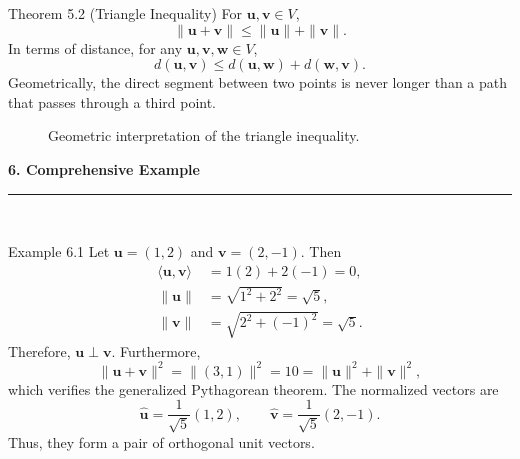 \documentclass[11pt,letterpaper]{article}
\newcommand{\manualsection}[1]{%
  \Needspace{16\baselineskip}%
  \vspace{0.35cm}
  {\Large\bfseries\color{blackmain} #1}\\[2pt]
  {\color{orangeacc}\rule{\linewidth}{1.4pt}}\\[0.25cm]
}
\begin{document}
\begin{theorembox}{Theorem 5.2 (Triangle Inequality)}
For $\mathbf{u},\mathbf{v}\in V$,
\begin{equation}
  \|\mathbf{u}+\mathbf{v}\|\leq\|\mathbf{u}\|+\|\mathbf{v}\|.
\end{equation}
In terms of distance, for any $\mathbf{u},\mathbf{v},\mathbf{w}\in V$,
\begin{equation}
  d(\mathbf{u},\mathbf{v})
  \leq d(\mathbf{u},\mathbf{w})+d(\mathbf{w},\mathbf{v}).
\end{equation}
Geometrically, the direct segment between two points is never longer than a path
that passes through a third point.
\end{theorembox}

\begin{figure}[htbp]
\centering
{}
\caption{Geometric interpretation of the triangle inequality.}
\label{fig:triangle-inequality}
\end{figure}
\FloatBarrier

\manualsection{6. Comprehensive Example}

\begin{examplebox}{Example 6.1}
Let $\mathbf{u}=(1,2)$ and $\mathbf{v}=(2,-1)$. Then
\begin{align*}
  \langle\mathbf{u},\mathbf{v}\rangle&=1(2)+2(-1)=0,\\
  \|\mathbf{u}\|&=\sqrt{1^2+2^2}=\sqrt{5},\\
  \|\mathbf{v}\|&=\sqrt{2^2+(-1)^2}=\sqrt{5}.
\end{align*}
Therefore, $\mathbf{u}\perp\mathbf{v}$. Furthermore,
\[
  \|\mathbf{u}+\mathbf{v}\|^2
  =\|(3,1)\|^2=10
  =\|\mathbf{u}\|^2+\|\mathbf{v}\|^2,
\]
which verifies the generalized Pythagorean theorem. The normalized vectors are
\[
  \widehat{\mathbf{u}}=\frac{1}{\sqrt5}(1,2),
  \qquad
  \widehat{\mathbf{v}}=\frac{1}{\sqrt5}(2,-1).
\]
Thus, they form a pair of orthogonal unit vectors.
\end{examplebox}
\end{document}
